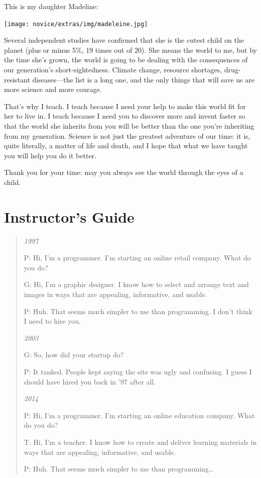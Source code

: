 \documentclass[]{book}
\begin{document}
This is my daughter Madeline:

\texttt{[image: novice/extras/img/madeleine.jpg]}

Several independent studies have confirmed that she is the cutest child
on the planet (plus or minus 5\%, 19 times out of 20). She means the
world to me, but by the time she's grown, the world is going to be
dealing with the consequences of our generation's short-sightedness.
Climate change, resource shortages, drug-resistant diseases---the list
is a long one, and the only things that will save us are more science
and more courage.

That's why I teach. I teach because I need your help to make this world
fit for her to live in. I teach because I need you to discover more and
invent faster so that the world she inherits from you will be better
than the one you're inheriting from my generation. Science is not just
the greatest adventure of our time: it is, quite literally, a matter of
life and death, and I hope that what we have taught you will help you do
it better.

Thank you for your time: may you always see the world through the eyes
of a child.

\chapter{Instructor's Guide}\label{instructors-guide}

\begin{quote}
\emph{1997}

P: Hi, I'm a programmer. I'm starting an online retail company. What do
you do?

G: Hi, I'm a graphic designer. I know how to select and arrange text and
images in ways that are appealing, informative, and usable.

P: Huh. That seems much simpler to me than programming. I don't think I
need to hire you.

\emph{2003}

G: So, how did your startup do?

P: It tanked. People kept saying the site was ugly and confusing. I
guess I should have hired you back in '97 after all.

\emph{2014}

P: Hi, I'm a programmer. I'm starting an online education company. What
do you do?

T: Hi, I'm a teacher. I know how to create and deliver learning
materials in ways that are appealing, informative, and usable.

P: Huh. That seems much simpler to me than programming\ldots{}
\end{quote}
\end{document}
